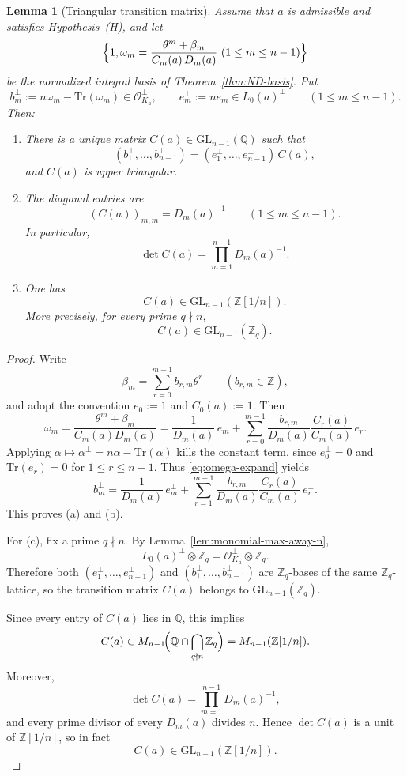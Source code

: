 \documentclass[11pt,letterpaper]{amsart}
\newcommand{\Q}{\mathbb{Q}}
\newcommand{\Z}{\mathbb{Z}}
\newcommand{\cO}{\mathcal{O}}
\newcommand{\GL}{\mathrm{GL}}
\newcommand{\Tr}{\mathrm{Tr}}
\theoremstyle{plain}
\newtheorem{lemma}[theorem]{Lemma}
\theoremstyle{definition}
\begin{document}
\begin{lemma}[Triangular transition matrix]\label{lem:C-matrix}
Assume that $a$ is admissible and satisfies Hypothesis~\textup{(H)}, and let
\[
\Bigl\{1,\omega_m=\frac{\theta^m+\beta_m}{C_m(a)\,D_m(a)}\ (1\le m\le n-1)\Bigr\}
\]
be the normalized integral basis of Theorem~\ref{thm:ND-basis}.
Put
\[
b_m^\perp:=n\omega_m-\Tr(\omega_m)\in \cO_{K_a}^\perp,
\qquad
e_m^\perp:=n e_m\in L_0(a)^\perp
\qquad(1\le m\le n-1).
\]
Then:

\begin{enumerate}[label=(\alph*)]
\item There is a unique matrix $C(a)\in \GL_{n-1}(\Q)$ such that
\begin{equation}\label{eq:b-e-C}
(b_1^\perp,\dots,b_{n-1}^\perp)=(e_1^\perp,\dots,e_{n-1}^\perp)\,C(a),
\end{equation}
and $C(a)$ is upper triangular.

\item The diagonal entries are
\[
(C(a))_{m,m}=D_m(a)^{-1}\qquad(1\le m\le n-1).
\]
In particular,
\[
\det C(a)=\prod_{m=1}^{n-1}D_m(a)^{-1}.
\]

\item One has
\[
C(a)\in \GL_{n-1}(\Z[1/n]).
\]
More precisely, for every prime $q\nmid n$,
\[
C(a)\in \GL_{n-1}(\Z_q).
\]
\end{enumerate}
\end{lemma}

\begin{proof}
Write
\[
\beta_m=\sum_{r=0}^{m-1} b_{r,m}\theta^r
\qquad (b_{r,m}\in\Z),
\]
and adopt the convention $e_0:=1$ and $C_0(a):=1$.
Then
\begin{equation}\label{eq:omega-expand}
\omega_m
=\frac{\theta^m+\beta_m}{C_m(a)D_m(a)}
=\frac{1}{D_m(a)}\,e_m
 +\sum_{r=0}^{m-1}\frac{b_{r,m}}{D_m(a)}\frac{C_r(a)}{C_m(a)}\,e_r.
\end{equation}
Applying $\alpha\mapsto \alpha^\perp=n\alpha-\Tr(\alpha)$ kills the constant term, since $e_0^\perp=0$ and
$\Tr(e_r)=0$ for $1\le r\le n-1$.
Thus \eqref{eq:omega-expand} yields
\begin{equation}\label{eq:b-expand}
b_m^\perp
=\frac{1}{D_m(a)}\,e_m^\perp
 +\sum_{r=1}^{m-1}\frac{b_{r,m}}{D_m(a)}\frac{C_r(a)}{C_m(a)}\,e_r^\perp.
\end{equation}
This proves (a) and (b).

For (c), fix a prime \(q\nmid n\).
By Lemma~\ref{lem:monomial-max-away-n},
\[
L_0(a)^\perp\otimes \Z_q=\cO_{K_a}^\perp\otimes \Z_q.
\]
Therefore both \((e_1^\perp,\dots,e_{n-1}^\perp)\) and \((b_1^\perp,\dots,b_{n-1}^\perp)\)
are \(\Z_q\)-bases of the same \(\Z_q\)-lattice, so the transition matrix \(C(a)\) belongs to
\(\GL_{n-1}(\Z_q)\).

Since every entry of \(C(a)\) lies in \(\Q\), this implies
\[
C(a)\in M_{n-1}\!\Bigl(\Q\cap \bigcap_{q\nmid n}\Z_q\Bigr)
      = M_{n-1}(\Z[1/n]).
\]
Moreover,
\[
\det C(a)=\prod_{m=1}^{n-1}D_m(a)^{-1},
\]
and every prime divisor of every \(D_m(a)\) divides \(n\). Hence \(\det C(a)\) is a unit
of \(\Z[1/n]\), so in fact
\[
C(a)\in \GL_{n-1}(\Z[1/n]).
\]
\end{proof}
\end{document}
